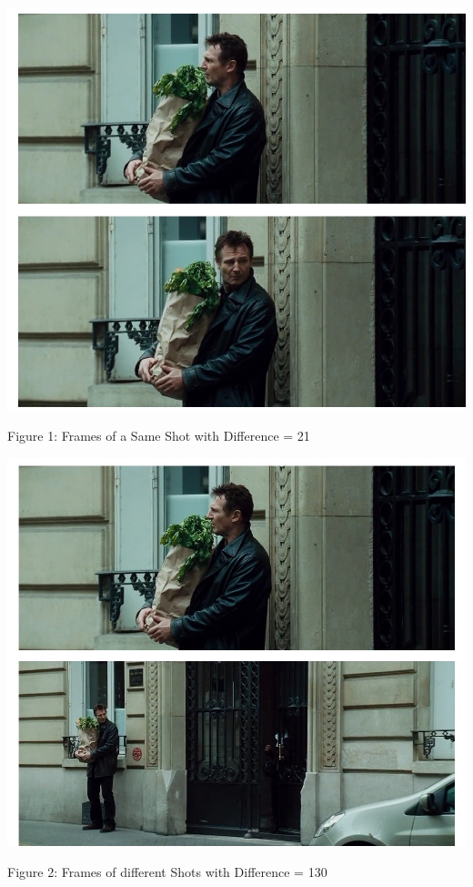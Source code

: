 \documentclass[twocolumn,twoside]{article}
\begin{document}
		\vspace{0.1cm}
		\begin{center}
				\includegraphics[scale=0.2]{sameshot}
		\end{center}
		\vspace{-0.6cm}
		\begin{center}
				{\tiny Figure 1: Frames of a Same Shot with Difference = 21}
		\end{center}
		\vspace{0.1cm}
		\begin{center}
				\includegraphics[scale=0.2]{diffshot}
		\end{center}
		\vspace{-0.6cm}
		\begin{center}
				{\tiny Figure 2: Frames of different Shots with Difference = 130}
		\end{center}
		\vspace{0.2cm}
\end{document}
